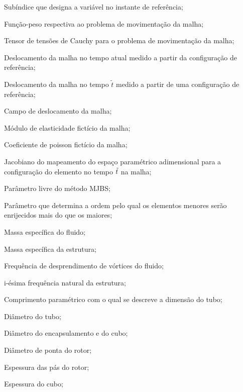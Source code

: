 \begin{simbolos}
   \item[$(\bullet)_{\tildet}$] Subíndice que designa a variável no instante de referência;
   \item[$\mathbf{w}_M$] Função-peso respectiva ao problema de movimentação da malha;
   \item[$\stressTensorM$] Tensor de tensões de Cauchy para o problema de movimentação da malha;
   \item[$\bar{\mathbf{z}}$] Deslocamento da malha no tempo atual medido a partir da configuração de referência;
   \item[$\bar{\mathbf{z}}_{\tilde{t}}$] Deslocamento da malha no tempo $\tilde{t}$ medido a partir de uma configuração de referência;
   \item[$\dispM$] Campo de deslocamento da malha;
   \item[$\elasticityM$] Módulo de elasticidade fictício da malha;
   \item[$\poissonm$] Coeficiente de poisson fictício da malha;
   \item[$\jacM$] Jacobiano do mapeamento do espaço paramétrico adimensional para a configuração do elemento no tempo $\tilde{t}$ na malha;
   \item[$(\jacM)_{0}$] Parâmetro livre do método MJBS;
   \item[$\chi_M$] Parâmetro que determina a ordem pelo qual os elementos menores serão enrijecidos mais do que os maiores;
   \item[$\rho_f$] Massa específica do fluido;
   \item[$\rho_e$] Massa específica da estrutura;
   \item[$f_{v}$] Frequência de desprendimento de vórtices do fluido;
   \item[$f_{i}$] i-ésima frequência natural da estrutura;
   \item[$L_t$] Comprimento paramétrico com o qual se descreve a dimensão do tubo;
   \item[$D_t$] Diâmetro do tubo;
   \item[$d$] Diâmetro do encapsulamento e do cubo;
   \item[$D_p$] Diâmetro de ponta do rotor;
   \item[$t_p$] Espessura das pás do rotor;
   \item[$t_c$] Espessura do cubo;
   
   
\end{simbolos}